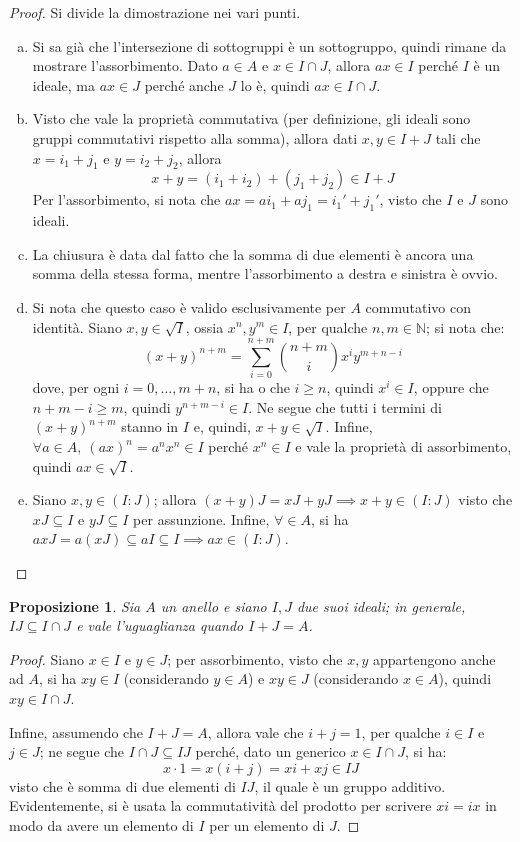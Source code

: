 \documentclass[11pt]{article}
\theoremstyle{style}
\newtheorem{prop}{Proposizione}[section]
\numberwithin{equation}{subsection}
\begin{document}
	\begin{proof}
		Si divide la dimostrazione nei vari punti.
		\begin{enumerate}[(a).]
			\item Si sa gi\`a che l'intersezione di sottogruppi \`e un sottogruppo, quindi rimane da mostrare l'assorbimento.
				Dato $a \in A$ e $x \in I \cap J$, allora $ax \in I$ perch\'e $I$ \`e un ideale, ma $ax \in J$ perch\'e anche $J$ lo \`e, quindi $ax \in I \cap J$.
			\item Visto che vale la propriet\`a commutativa (per definizione, gli ideali sono gruppi commutativi rispetto alla somma), allora dati $x, y \in I+J$ tali che $x = i_1 + j_1$ e $y = i_2+j_2$, allora
				\[
				x + y = (i_1+i_2)+(j_1+j_2) \in I+J
				\] 
				Per l'assorbimento, si nota che $ax = ai_1 + aj_1 = i_1' + j_1'$, visto che $I$ e $J$ sono ideali.
			\item La chiusura \`e data dal fatto che la somma di due elementi \`e ancora una somma della stessa forma, mentre l'assorbimento a destra e sinistra \`e ovvio.
			\item Si nota che questo caso \`e valido esclusivamente per $A$ commutativo con identit\`a.
				Siano $x,y \in \sqrt{I} $, ossia $x^n , y ^m \in I$, per qualche $n,m\in \mathbb{N}$; si nota che:
				\[
					(x+y)^{n+m} = \sum_{i=0}^{n+m} \binom{n+m}{i} x^i y^{m+n - i}
				\] 
				dove, per ogni $i= 0,\ldots,m+n$, si ha o che $i\ge n$, quindi $x^i \in I$, oppure che $n+m -i \ge m$, quindi $y^{n+m-i } \in I$.
				Ne segue che tutti i termini di $(x+y)^{n+m} $ stanno in $I$ e, quindi, $x+y \in \sqrt{I} $.
				Infine, $\forall  a \in A,\ (ax)^n = a^n x^n \in I$ perch\'e $x^n \in I$ e vale la propriet\`a di assorbimento, quindi $ax \in \sqrt{I} $.
			\item Siano $x,y \in (I:J)$; allora $(x+y) J = xJ + yJ \implies x+y \in (I:J)$ visto che $xJ \subseteq I$ e $yJ \subseteq I$ per assunzione.
				Infine, $\forall  \in A$, si ha $axJ = a(xJ) \subseteq aI \subseteq I \implies ax \in (I:J)$.
		\end{enumerate}
	\end{proof}
\begin{prop}
	Sia $A$ un anello e siano $I,J$ due suoi ideali; in generale, $IJ\subseteq  I\cap J$ e vale l'uguaglianza quando $I+J = A$.
\end{prop}
	\begin{proof}
		Siano $x \in I$ e $y \in J$; per assorbimento, visto che $x,y$ appartengono anche ad $A$, si ha $xy \in I$ (considerando $y \in A$) e $xy \in J$ (considerando $x \in A$), quindi $xy \in I\cap J$.

		Infine, assumendo che $I + J = A$, allora vale che $i + j = 1$, per qualche $i \in I$ e $j \in J$; ne segue che $I\cap J \subseteq IJ$ perch\'e, dato un generico $x \in I\cap J$, si ha:
		\[
		x \cdot 1 = x (i + j) = xi  + xj \in IJ
		\] 
		visto che \`e somma di due elementi di $IJ$, il quale \`e un gruppo additivo. 
		Evidentemente, si \`e usata la commutativit\`a del prodotto per scrivere $x i = i x$ in modo da avere un elemento di $I$ per un elemento di $J$.
	\end{proof}
\end{document}
